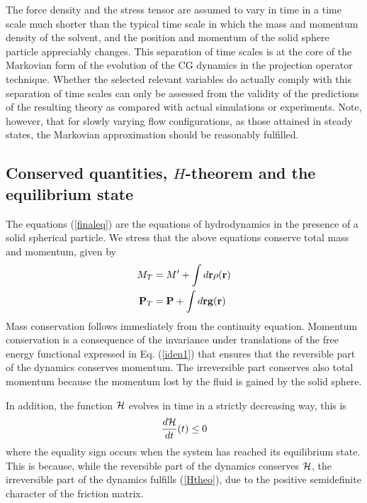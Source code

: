 \documentclass[b5paper,openright,11pt]{book}
\begin{document}
The force density and the stress tensor are assumed to vary in time in
a time  scale much shorter  than the typical  time scale in  which the
mass  and  momentum density  of  the  solvent,  and the  position  and
momentum  of  the solid  sphere  particle  appreciably changes.   This
separation of time scales is at the  core of the Markovian form of the
evolution   of   the   CG   dynamics  in   the   projection   operator
technique. Whether the selected  relevant variables do actually comply
with  this separation  of time  scales can  only be  assessed from  the
validity of the  predictions of the resulting theory  as compared with
actual   simulations  or   experiments.   Note,   however,  that   for
slowly varying flow  configurations, as  those attained  in steady
states, the Markovian approximation should be reasonably fulfilled.

\subsection{Conserved quantities, $H$-theorem and the equilibrium state}
The equations  (\ref{finaleq}) are the equations  of hydrodynamics in
the  presence of  a solid  spherical particle.  We
stress  that  the  above  equations conserve  total  mass  and
momentum, given by
\begin{align}
  M_T&=M'+\int d{\bf r}\rho({\bf r})
\nonumber\\
{\bf P}_T&={\bf P}+\int d{\bf r}{\bf g}({\bf r})
\end{align}
Mass conservation  follows immediately  from the  continuity equation.
Momentum  conservation  is  a  consequence  of  the  invariance  under
translations   of   the   free    energy   functional   expressed   in
Eq.  (\ref{iden1})  that  ensures  that the  reversible  part  of  the
dynamics  conserves momentum.   The irreversible  part conserves  also
total  momentum because  the
momentum lost by the fluid is gained by the solid sphere.

In  addition, the  function ${\cal H}$  evolves in time  in a
strictly decreasing way, this is
\begin{align}
  \frac{d{\cal H}}{dt}(t)\le 0
\label{Htheo}\end{align}
where  the  equality sign  occurs  when  the  system has  reached  its
equilibrium state.  This  is because, while the reversible  part of the
dynamics conserves  ${\cal H}$,  the irreversible part  of the
dynamics  fulfills  (\ref{Htheo}), due  to  the positive  semidefinite
character of  the friction matrix.  
\end{document}
